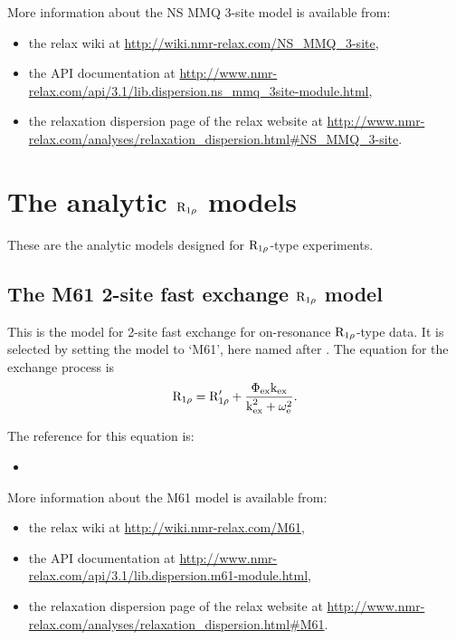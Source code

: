 More information about the NS MMQ 3-site model is available from:
\begin{itemize}
  \item the relax wiki at \url{http://wiki.nmr-relax.com/NS\_MMQ\_3-site},
  \item the API documentation at \url{http://www.nmr-relax.com/api/3.1/lib.dispersion.ns\_mmq\_3site-module.html},
  \item the relaxation dispersion page of the relax website at \url{http://www.nmr-relax.com/analyses/relaxation\_dispersion.html#NS\_MMQ\_3-site}.
\end{itemize}




\section{The analytic $\mathrm{R}_{1\rho}$ models}
\label{sect: dispersion: analytic R1rho models}

These are the analytic models designed for $\mathrm{R}_{1\rho}$-type experiments.



\subsection{The M61 2-site fast exchange $\mathrm{R}_{1\rho}$ model}
\label{sect: dispersion: M61 model}

This is the model for 2-site fast exchange for on-resonance $\mathrm{R}_{1\rho}$-type data.
It is selected by setting the model to `M61', here named after \citet{Meiboom61}.
The equation for the exchange process is
\begin{equation}
    \mathrm{R}_{1\rho} = \mathrm{R}_{1\rho}' + \frac{\Phi_\textrm{ex}\textrm{k}_\textrm{ex}}{\textrm{k}_\textrm{ex}^2 + \omega_\textrm{e}^2}.
\end{equation}

The reference for this equation is:
\begin{itemize}
  \item {}
\end{itemize}

More information about the M61 model is available from:
\begin{itemize}
  \item the relax wiki at \url{http://wiki.nmr-relax.com/M61},
  \item the API documentation at \url{http://www.nmr-relax.com/api/3.1/lib.dispersion.m61-module.html},
  \item the relaxation dispersion page of the relax website at \url{http://www.nmr-relax.com/analyses/relaxation\_dispersion.html#M61}.
\end{itemize}


